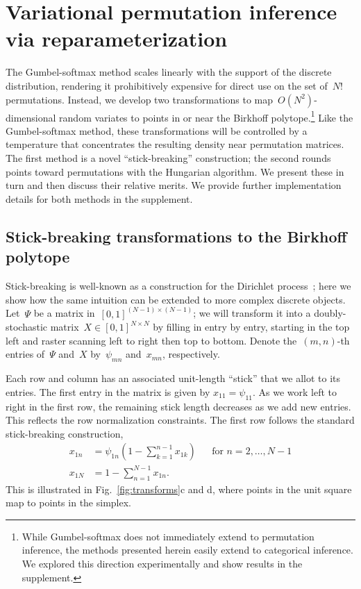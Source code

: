 \documentclass[twoside]{article}
\begin{document}
\section{Variational permutation inference via reparameterization}
\label{sec:permutation}
The Gumbel-softmax method scales linearly with the support of the
discrete distribution, rendering it prohibitively expensive for direct
use on the set of~$N!$ permutations.  Instead, we develop two
transformations to map~$O(N^2)$-dimensional random variates to points
in or near the Birkhoff polytope.\footnote{While Gumbel-softmax does
  not immediately extend to permutation inference, the methods
  presented herein easily extend to categorical inference.  We
  explored this direction experimentally and show results in the
  supplement.}  Like the Gumbel-softmax method, these transformations
will be controlled by a temperature that concentrates the resulting
density near permutation matrices.  The first method is a novel
``stick-breaking'' construction; the second rounds points toward
permutations with the Hungarian algorithm.  We present these in turn
and then discuss their relative merits. We provide further
implementation details for both methods in the supplement.

\subsection{Stick-breaking transformations to the Birkhoff polytope}
Stick-breaking is well-known as a construction for the Dirichlet
process~\citep{sethuraman1994constructive}; here we show how the
same intuition can be extended to more complex discrete objects. 
Let~$\Psi$ be a matrix in~${[0,1]^{(N-1) \times (N-1)}}$; we will
transform it into a doubly-stochastic
matrix~${X \in [0,1]^{N \times N}}$ by filling in entry by entry, starting
in the top left and raster scanning left to right then top to
bottom. Denote the~$(m,n)$-th entries of~$\Psi$ and~$X$ by~$\psi_{mn}$
and~${x}_{mn}$, respectively.

Each row and column has an associated unit-length ``stick'' that we
allot to its entries.  The first entry in the matrix is given by
$x_{11} = \psi_{11}$.  As we work left to right in the first row, the
remaining stick length decreases as we add new entries. This reflects
the row normalization constraints.  The first row follows the standard
stick-breaking construction,
\begin{align*}
  x_{1n} &= \psi_{1n} \left(1 - \sum_{k=1}^{n-1} x_{1k} \right)  & &  \text{for } n=2, \ldots, N-1\\
  x_{1N} &= 1 - \sum_{n=1}^{N-1} x_{1n}.
\end{align*}
This is illustrated in Fig.~\ref{fig:transforms}c and d, where points
in the unit square map to points in the simplex. 
\end{document}
